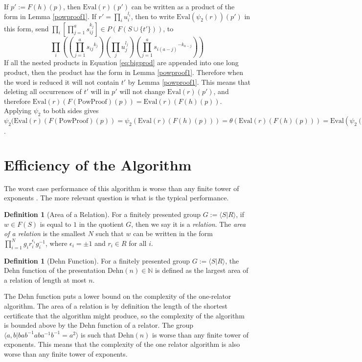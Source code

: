 \documentclass[12pt]{article} %
\theoremstyle{definition}
\theoremstyle{definition}
\theoremstyle{definition}
\theoremstyle{definition}
\theoremstyle{definition}
\newtheorem{defn}[theorem]{Definition}
\theoremstyle{definition}
\begin{document}
If $p' := F(h)(p)$,
then $\text{Eval}(r)(p')$ can be written as a product of the form in
Lemma \ref{powproof1}.
If $r' = \prod_i u_i^{l_i}$, then to write $\text{Eval}(\psi_2(r))(p')$ in this
form, send $\prod_i \left[\prod_{j = 1}^a s_{ij}^{k_j}\right]
\in P(F(S \cup \{t'\}))$, to
\begin{equation} \label{eq:bigprod}
  \prod_i \left(\left(\prod_{j = 1}^a {s_{ij}}^{k_j}\right) \left(\prod_j u_j^{l_j}\right)
  \left(\prod_{j = 1}^a {s_{i(a - j)}}^{-k_{a - j}}\right)\right)
\end{equation}
If all the nested products in Equation \ref{eq:bigprod} are appended into one long product,
then the product has the form in Lemma \ref{powproof1}. Therefore when the word is reduced
it will not contain $t'$ by Lemma \ref{powproof1}. This means that deleting all occurrences of
$t'$ will in $p'$ will not change $\text{Eval}(r)(p')$, and therefore
$\text{Eval}(r)(F(\text{PowProof})(p)) = \text{Eval}(r)(F(h)(p))$.
Applying $\psi_2$ to both sides gives
$\psi_2(\text{Eval}(r)(F(\text{PowProof})(p)) =
  \psi_2(\text{Eval}(r)(F(h)(p))) =
  \theta(\text{Eval}(r)(F(h)(p))) =
  \text{Eval}(\psi_2(r))(p)$.

\section{Efficiency of the Algorithm}

  The worst case performance of this algorithm is worse than any finite tower of exponents
  \cite{miasnikov2011word}. The more relevant question is what is the typical performance.

  \begin{defn}[Area of a Relation]
  For a finitely presented group $G := \langle S | R\rangle$, if $w \in F(S)$ is equal
  to $1$ in the quotient $G$, then we say it is a \textit{relation}.
  The \textit{area of a relation} is the smallest $N$ such that $w$ can be written
  in the form $\prod_{i=1}^N g_i r_i^{\epsilon_i} g_i^{-1}$, where $\epsilon_i = \pm 1$
  and $r_i \in R$ for all $i$.
  \end{defn}

  \begin{defn}[Dehn Function]
  For a finitely presented group $G := \langle S | R\rangle$, the Dehn function
  of the presentation $\text{Dehn}(n) \in \mathbb{N}$ is defined as the
  largest area of a relation of length at most $n$.
  \end{defn}

  The Dehn function puts a lower bound on the complexity of the one-relator algorithm.
  The area of a relation is by definition the length of the shortest certificate
  that the algorithm might produce, so the complexity of the algorithm is bounded above by
  the Dehn function of a relator.
  The group $\langle a, b | b a b^{-1} a b a^{-1} b^{-1} = a^2\rangle$ is such that
  $\text{Dehn}(n)$ is worse than any finite tower of exponents. This means that the
  complexity of the one relator algorithm is also worse than any finite tower of
  exponents.
\end{document}
